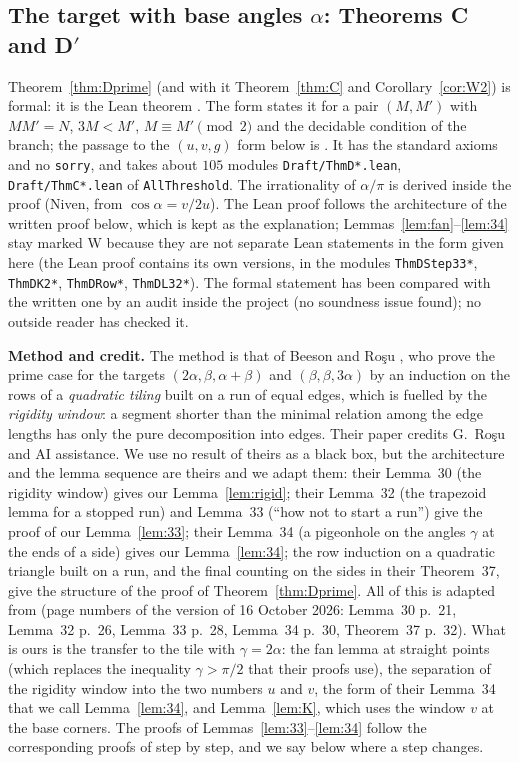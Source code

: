 \documentclass[11pt,reqno]{amsart}
\theoremstyle{plain}
\theoremstyle{definition}
\newcommand{\sW}{\textup{\textsf{W}}}
\begin{document}
\subsection{The target with base angles $\alpha$: Theorems C and D$'$}\label{sub:aprimehand}

Theorem~\ref{thm:Dprime} (and with it Theorem~\ref{thm:C} and Corollary~\ref{cor:W2}) is formal: it is the Lean theorem
. The form  states it for a pair $(M,M')$ with $MM'=N$, $3M<M'$,
$M\equiv M'\pmod2$ and the decidable condition of the branch; the passage to the $(u,v,g)$ form below is
. It has the standard axioms and no \texttt{sorry}, and takes about $105$ modules
\texttt{Draft/ThmD*.lean}, \texttt{Draft/ThmC*.lean} of \texttt{AllThreshold}. The irrationality of $\alpha/\pi$ is derived
inside the proof (Niven, from $\cos\alpha=v/2u$). The Lean proof follows the architecture of the written proof below, which is kept as
the explanation; Lemmas~\ref{lem:fan}--\ref{lem:34} stay marked \sW{} because they are not separate Lean statements in the form given
here (the Lean proof contains its own versions, in the modules \texttt{ThmDStep33*}, \texttt{ThmDK2*}, \texttt{ThmDRow*}, \texttt{ThmDL32*}). The formal statement has been compared with the written one by an
audit inside the project (no soundness issue found); no outside reader has checked it.

\medskip\noindent\textbf{Method and credit.} The method is that of Beeson and Ro\c{s}u \cite{BeesonRosu}, who prove the
prime case for the targets $(2\alpha,\beta,\alpha+\beta)$ and $(\beta,\beta,3\alpha)$ by an induction on the rows of a
\emph{quadratic tiling} built on a run of equal edges, which is fuelled by the \emph{rigidity window}: a segment shorter than
the minimal relation among the edge lengths has only the pure decomposition into edges. Their paper credits G.~Ro\c{s}u and
AI assistance. We use no result of theirs as a black box, but the architecture and the lemma sequence are theirs and we
adapt them: their Lemma~30 (the rigidity window) gives our Lemma~\ref{lem:rigid}; their Lemma~32 (the trapezoid lemma for
a stopped run) and Lemma~33 (``how not to start a run'') give the proof of our Lemma~\ref{lem:33}; their Lemma~34 (a
pigeonhole on the angles $\gamma$ at the ends of a side) gives our Lemma~\ref{lem:34}; the row induction on a quadratic
triangle built on a run, and the final counting on the sides in their Theorem~37, give the structure of the proof of
Theorem~\ref{thm:Dprime}. All of this is adapted from \cite{BeesonRosu} (page numbers of the version of 16 October 2026:
Lemma~30 p.~21, Lemma~32 p.~26, Lemma~33 p.~28, Lemma~34 p.~30, Theorem~37 p.~32). What is ours is the transfer to the tile with $\gamma=2\alpha$:
the fan lemma at straight points (which replaces the inequality $\gamma>\pi/2$ that their proofs use), the separation of the
rigidity window into the two numbers $u$ and $v$, the form of their Lemma~34 that we call Lemma~\ref{lem:34}, and
Lemma~\ref{lem:K}, which uses the window $v$ at the base corners. The proofs of Lemmas~\ref{lem:33}--\ref{lem:34} follow
the corresponding proofs of \cite{BeesonRosu} step by step, and we say below where a step changes.
\end{document}
